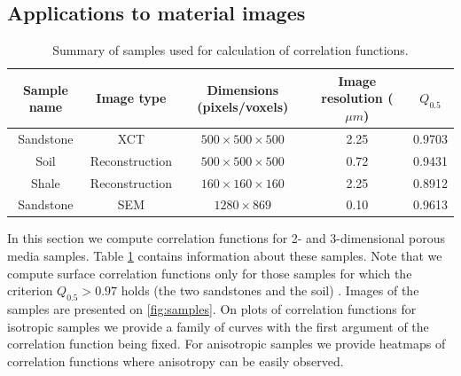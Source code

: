 \documentclass[reprint,amsmath,amssymb,aps,pre,showkeys,showpacs]{revtex4-1}
\begin{document}
\subsection{Applications to material images}
\begin{table}[!htp]
  \centering
  \begin{tabular}{|c|c|c|c|c|}
    \hline
    Sample name & Image type & Dimensions (pixels/voxels) & Image resolution ($\mu m$)
    & $Q_{0.5}$ \\
    \hline
    Sandstone & XCT &  $500 \times 500 \times 500$ & 2.25 & 0.9703 \\
    Soil & Reconstruction & $500 \times 500 \times 500$ & 0.72 & 0.9431 \\
    Shale & Reconstruction & $160 \times 160 \times 160$ & 2.25 & 0.8912 \\
    Sandstone & SEM &  $1280 \times 869$ & 0.10 & 0.9613 \\
    \hline
  \end{tabular}
  \caption{Summary of samples used for calculation of correlation functions.}
  \label{tab:summary}
\end{table}
In this section we compute correlation functions for 2- and 3-dimensional porous
media samples. Table \ref{tab:summary} contains information about these
samples. Note that we compute surface correlation functions only for those
samples for which the criterion $Q_{0.5} > 0.97$ holds (the two sandstones and
the soil) \cite{samarin2023robust}. Images of the samples are presented on
\cref{fig:samples}. On plots of correlation functions for isotropic samples we
provide a family of curves with the first argument of the correlation function
being fixed. For anisotropic samples we provide heatmaps of correlation
functions where anisotropy can be easily observed.
\end{document}

